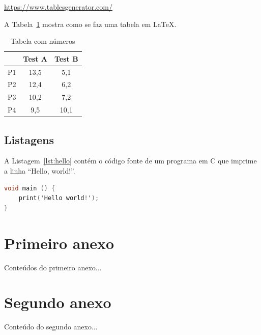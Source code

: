 \documentclass[12pt,a4paper,twoside]{report}
\begin{document}
\url{https://www.tablesgenerator.com/}

A Tabela~\ref{tab:numeros} mostra como se faz uma tabela em \LaTeX.

\begin{table}[h!]
\center
\begin{tabular}{|l|c|c|}
\hline
 & Test A & Test B \\ \hline
P1 & 13,5 & 5,1 \\ \hline
P2 & 12,4 & 6,2 \\ \hline
P3 & 10,2 & 7,2 \\ \hline
P4 & 9,5 & 10,1 \\ \hline
\end{tabular}
\caption{Tabela com números}
\label{tab:numeros}
\end{table}

\section{Listagens}

A Listagem~\ref{lst:hello} contém o código fonte de um programa em C que imprime a linha ``Hello, world!''.

\begin{lstlisting}[caption=Programa Hello World, label=lst:hello, language=C]
void main () {
    print('Hello world!');
}
\end{lstlisting}





\appendix
\chapter{Primeiro anexo}
Conteúdos do primeiro anexo...

\chapter{Segundo anexo}
Conteúdo do segundo anexo...
\end{document}
